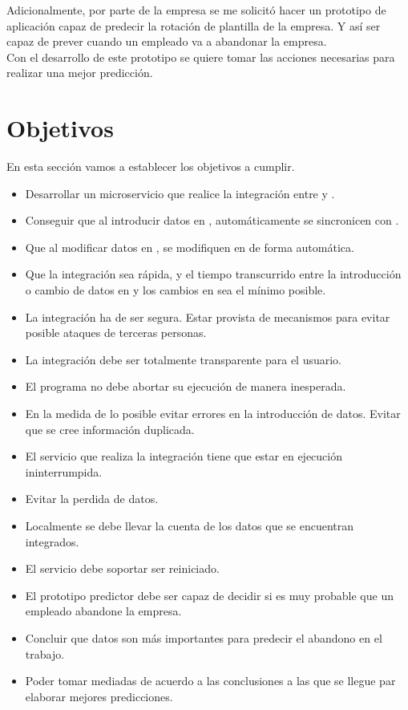 Adicionalmente, por parte de la empresa se me solicitó hacer un prototipo de aplicación capaz de predecir la rotación de plantilla de la empresa.
Y así ser capaz de prever cuando un empleado va a abandonar la empresa. \\

Con el desarrollo de este prototipo se quiere tomar las acciones necesarias para realizar una mejor predicción.



\section{Objetivos}

En esta sección vamos a establecer los objetivos a cumplir.

\begin{itemize}
	\item Desarrollar un microservicio que realice la integración entre \hs{} y \wday{}.
	\item Conseguir que al introducir datos en \hs{}, automáticamente se sincronicen con \wday{}.
	\item Que al modificar datos en \hs{}, se modifiquen en \wday{} de forma automática.
	\item Que la integración sea rápida, y el tiempo transcurrido entre la introducción o cambio de datos en \hs{} y los cambios en \wday{} sea el mínimo posible.
	\item La integración ha de ser segura. Estar provista de mecanismos para evitar posible ataques de terceras personas.
	\item La integración debe ser totalmente transparente para el usuario. 
	\item El programa no debe abortar su ejecución de manera inesperada.
	\item En la medida de lo posible evitar errores en la introducción de datos. Evitar que se cree información duplicada.
	\item El servicio que realiza la integración tiene que estar en ejecución ininterrumpida.
	\item Evitar la perdida de datos.
	\item Localmente se debe llevar la cuenta de los datos que se encuentran integrados.
	\item El servicio debe soportar ser reiniciado.
	\item El prototipo predictor debe ser capaz de decidir si es muy probable que un empleado abandone la empresa.
	\item Concluir que datos son más importantes para predecir el abandono en el trabajo.
	\item Poder tomar mediadas de acuerdo a las conclusiones a las que se llegue par elaborar mejores predicciones.
\end{itemize}


